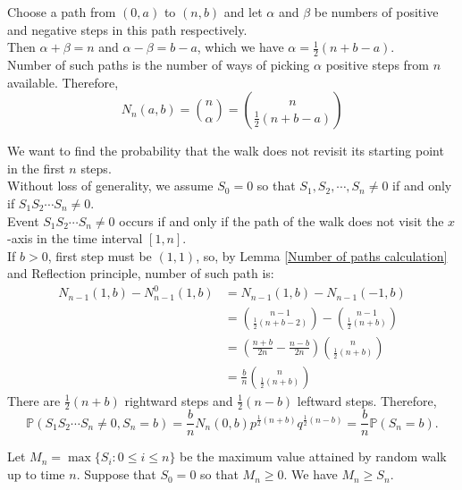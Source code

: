 \documentclass{huhtakm-template-book}
\newcommand{\prob}{\mathbb{P}}
\begin{document}
    \begin{proofing}
        Choose a path from $(0,a)$ to $(n,b)$ and let $\alpha$ and $\beta$ be numbers of positive and negative steps in this path respectively.\\
        Then $\alpha+\beta=n$ and $\alpha-\beta=b-a$, which we have $\alpha=\frac{1}{2}(n+b-a)$.\\
        Number of such paths is the number of ways of picking $\alpha$ positive steps from $n$ available. Therefore,
        \begin{equation*}
            N_{n}(a,b)=\binom{n}{\alpha}=\binom{n}{\frac{1}{2}(n+b-a)}
        \end{equation*}
    \end{proofing}
    \begin{eg}
        We want to find the probability that the walk does not revisit its starting point in the first $n$ steps.\\
        Without loss of generality, we assume $S_{0}=0$ so that $S_{1},S_{2},\cdots,S_{n}\neq 0$ if and only if $S_{1}S_{2}\cdots S_{n}\neq 0$.\\
        Event $S_{1}S_{2}\cdots S_{n}\neq 0$ occurs if and only if the path of the walk does not visit the $x$-axis in the time interval $[1,n]$.\\
        If $b>0$, first step must be $(1,1)$, so, by Lemma \ref{Number of paths calculation} and Reflection principle, number of such path is:
        \begin{align*}
            N_{n-1}(1,b)-N_{n-1}^{0}(1,b)&=N_{n-1}(1,b)-N_{n-1}(-1,b)\\
            &=\binom{n-1}{\frac{1}{2}(n+b-2)}-\binom{n-1}{\frac{1}{2}(n+b)}\\
            &=\left(\frac{n+b}{2n}-\frac{n-b}{2n}\right)\binom{n}{\frac{1}{2}(n+b)}\\
            &=\frac{b}{n}\binom{n}{\frac{1}{2}(n+b)}
        \end{align*}
        There are $\frac{1}{2}(n+b)$ rightward steps and $\frac{1}{2}(n-b)$ leftward steps. Therefore,
        \begin{equation*}
            \prob(S_{1}S_{2}\cdots S_{n}\neq 0,S_{n}=b)=\frac{b}{n}N_{n}(0,b)p^{\frac{1}{2}(n+b)}q^{\frac{1}{2}(n-b)}=\frac{b}{n}\prob(S_{n}=b).
        \end{equation*}
    \end{eg}
    \begin{eg}
        Let $M_{n}=\max\{S_{i}:0\leq i\leq n\}$ be the maximum value attained by random walk up to time $n$. Suppose that $S_{0}=0$ so that $M_{n}\geq 0$. We have $M_{n}\geq S_{n}$.
    \end{eg}
\end{document}
